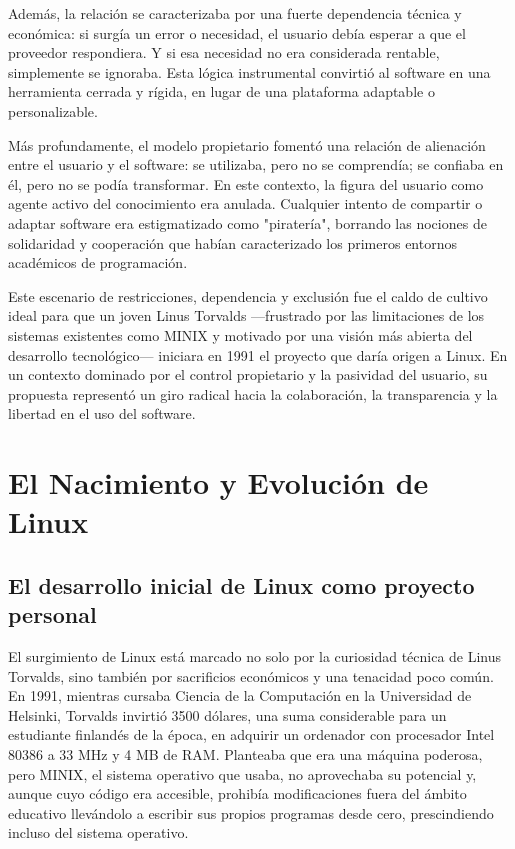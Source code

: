 \documentclass[a4paper,12pt]{article}
\begin{document}
Además, la relación se caracterizaba por una fuerte dependencia técnica y
económica: si surgía un error o necesidad, el usuario debía esperar a que el
proveedor respondiera. Y si esa necesidad no era considerada rentable,
simplemente se ignoraba. Esta lógica instrumental convirtió al software en una
herramienta cerrada y rígida, en lugar de una plataforma adaptable o
personalizable.

Más profundamente, el modelo propietario fomentó una relación de alienación
entre el usuario y el software: se utilizaba, pero no se comprendía; se confiaba
en él, pero no se podía transformar. En este contexto, la figura del usuario
como agente activo del conocimiento era anulada. Cualquier intento de compartir
o adaptar software era estigmatizado como "piratería", borrando las nociones de
solidaridad y cooperación que habían caracterizado los primeros entornos
académicos de programación.

Este escenario de restricciones, dependencia y exclusión fue el caldo de cultivo
ideal para que un joven Linus Torvalds —frustrado por las limitaciones de los
sistemas existentes como MINIX y motivado por una visión más abierta del
desarrollo tecnológico— iniciara en 1991 el proyecto que daría origen a Linux.
En un contexto dominado por el control propietario y la pasividad del usuario,
su propuesta representó un giro radical hacia la colaboración, la transparencia
y la libertad en el uso del software.

\newpage
\section{El Nacimiento y Evolución de Linux} 

\subsection{El desarrollo inicial de Linux como proyecto personal}

El surgimiento de Linux está marcado no solo por la curiosidad técnica de Linus Torvalds, 
sino también por sacrificios económicos y una tenacidad poco común. En 1991, mientras cursaba 
Ciencia de la Computación en la Universidad de Helsinki, Torvalds invirtió 3500 dólares, 
una suma considerable para un estudiante finlandés de la época, en adquirir un ordenador con 
procesador Intel 80386 a 33 MHz y 4 MB de RAM. Planteaba que era una máquina poderosa, pero MINIX, 
el sistema operativo que usaba, no aprovechaba su potencial y, aunque cuyo código era accesible, 
prohibía modificaciones fuera del ámbito educativo llevándolo a escribir sus propios programas desde cero, 
prescindiendo incluso del sistema operativo.
\end{document}
